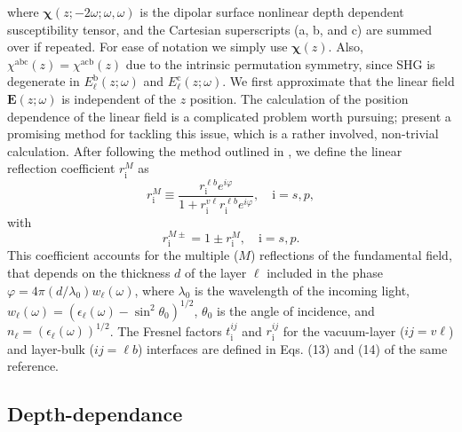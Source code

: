 \documentclass[utf8]{frontiersSCNS}
\begin{document}
where $\boldsymbol{\chi}(z;-2\omega;\omega,\omega)$ is the dipolar surface
nonlinear depth dependent susceptibility tensor, and the Cartesian superscripts
(a, b, and c) are summed over if repeated. For ease of notation we simply use
$\boldsymbol{\chi}(z)$. Also, $\chi^{\mathrm{abc}}(z) = \chi^{\mathrm{acb}}(z)$
due to the intrinsic permutation symmetry, since SHG is degenerate in
$E^{\mathrm{b}}_{\ell}(z;\omega)$ and $E^{\mathrm{c}}_{\ell}(z;\omega)$. We
first approximate that the linear field $\mathbf{E}(z;\omega)$ is independent of
the $z$ position. The calculation of the position dependence of the linear field
is a complicated problem worth pursuing; \cite{nicolasPRB15} present a promising
method for tackling this issue, which is a rather involved, non-trivial
calculation. After following the method outlined in \cite{andersonPRB16b}, we
define the linear reflection coefficient $r^{M}_{\mathrm{i}}$ as
\begin{equation}\label{mvrm}
r^{M}_{\mathrm{i}} \equiv 
\frac{r^{\ell b}_{\mathrm{i}}e^{i\varphi}}{1+r^{v\ell}_{\mathrm{i}}
r^{\ell b}_{\mathrm{i}}e^{i\varphi}}, \quad \mathrm{i}=s,p,
\end{equation}
with
\begin{equation}\label{eq:mvc}
r^{M\pm}_{\mathrm{i}} = 1\pm r^{M}_{\mathrm{i}},\quad \mathrm{i} = s,p.
\end{equation}
This coefficient accounts for the multiple ($M$) reflections of the fundamental
field, that depends on the thickness $d$ of the layer $\ell$ included in the
phase $\varphi = 4\pi(d/\lambda_{0})w_{\ell}(\omega)$, where $\lambda_{0}$ is
the wavelength of the incoming light, $w_{\ell}(\omega) =
(\epsilon_{\ell}(\omega) - \sin^{2}\theta_{0})^{1/2}$, $\theta_{0}$ is the angle
of incidence, and $n_{\ell} = (\epsilon_{\ell}(\omega))^{1/2}$. The Fresnel
factors $t^{ij}_{\mathrm{i}}$ and $r^{ij}_{\mathrm{i}}$ for the vacuum-layer
($ij = v\ell$) and layer-bulk ($ij = \ell b$) interfaces are defined in Eqs.
(13) and (14) of the same reference.



\subsection{Depth-dependance}
\end{document}

